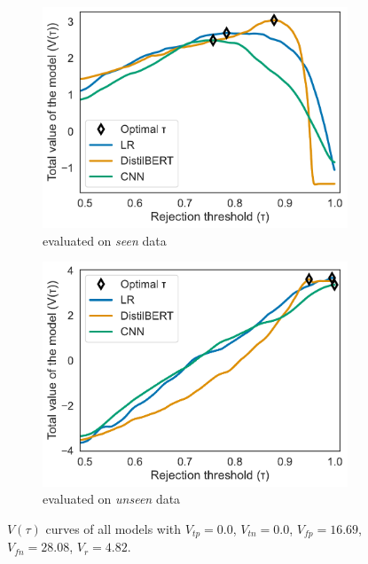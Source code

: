 \begin{figure}[t]
    \centering
    \begin{subfigure}{.49\textwidth}
        \includegraphics[scale=.4]{Figures/metric-tptn0-seen-data.pdf}
        \caption{evaluated on \emph{seen} data}
    \end{subfigure}
    \begin{subfigure}{.49\textwidth}
        \includegraphics[scale=.4]{Figures/metric-tptn0-unseen-data.pdf}
        \caption{evaluated on \emph{unseen} data}
    \end{subfigure}
    \caption{$V(\tau)$ curves of all models with $V_{tp} = 0.0$, $V_{tn} = 0.0$, $V_{fp} = 16.69$, $V_{fn} = 28.08$, $V_r = 4.82$.}
    \label{fig:metric-plots-tptn0}
\end{figure}


